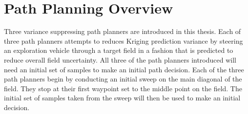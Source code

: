 






\section{Path Planning Overview}
Three variance suppressing path planners are introduced in this thesis. Each of three path planners attempts to reduces Kriging prediction variance by steering an exploration vehicle through a target field in a fashion that is predicted to reduce overall field uncertainty. All three of the path planners introduced will need an initial set of samples to make an initial path decision. Each of the three path planners begin by conducting an initial sweep on the main diagonal of the field. They stop at their first waypoint set to the middle point on the field. The initial set of samples taken from the sweep will then be used to make an initial decision.

